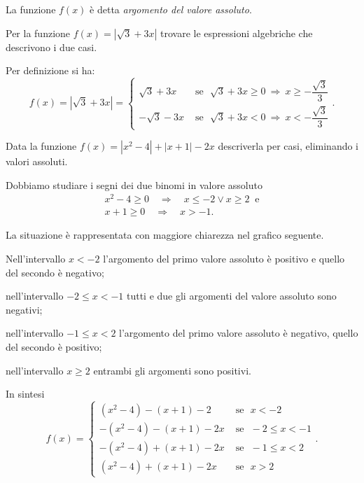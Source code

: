 La funzione $f(x)$ è detta \textit{argomento del valore assoluto}.

\begin{exrig}
\begin{esempio}
Per la funzione $f(x)=\left|\sqrt 3+3x\right|$ trovare le espressioni algebriche che descrivono i due casi.

Per definizione si ha: 
\[f(x)=\left|\sqrt 3+3x\right|=\begin{cases}\sqrt 3+3x & \text{ se~~}\sqrt 3+3x\ge 0\:\Rightarrow\: x\ge -\dfrac{\sqrt 3} 3\\-\sqrt 3-3x & \text{ se~~}\sqrt 3+3x<0\:\Rightarrow\: x<-\dfrac{\sqrt 3} 3\end{cases}.\]
\end{esempio}
\pagebreak
\begin{esempio}
Data la funzione $f(x)=\left|x^2-4\right|+\left|x+1\right|-2x$ descriverla per casi, eliminando i valori assoluti.

Dobbiamo studiare i segni dei due binomi in valore assoluto 
\[\begin{array}{l}x^2-4\ge 0\quad\Rightarrow\quad x\le -2\vee x\ge 2~\text{ e} \\x+1\ge 0\quad\Rightarrow\quad x>-1.\end{array}\]

La situazione è rappresentata con maggiore chiarezza nel grafico seguente.
\begin{center}

\end{center}

\begin{itemize*}
\item Nell'intervallo $x<-2$ l'argomento del primo valore assoluto è positivo e quello del secondo è negativo;
\item nell'intervallo $-2\le x<-1$ tutti e due gli argomenti del valore assoluto sono negativi;
\item nell'intervallo $-1\le x<2$ l'argomento del primo valore assoluto è negativo, quello del secondo è positivo;
\item nell'intervallo $x\ge 2$ entrambi gli argomenti sono positivi.
\end{itemize*}
In sintesi 
\[f(x)=
\begin{cases}(x^2-4)-(x+1)-2 & \text{ se~~}x<-2 \\
-(x^2-4)-(x+1)-2x & \text{ se~~}-2\le x<-1 \\
-(x^2-4)+(x+1)-2x & \text{ se~~}-1\le x<2 \\
(x^2-4)+(x+1)-2x & \text{ se~~}x>2
\end{cases}.\]
\end{esempio}
\end{exrig}
\ovalbox{\risolvii \ref{ese:7.1}, \ref{ese:7.2}, \ref{ese:7.3}}

